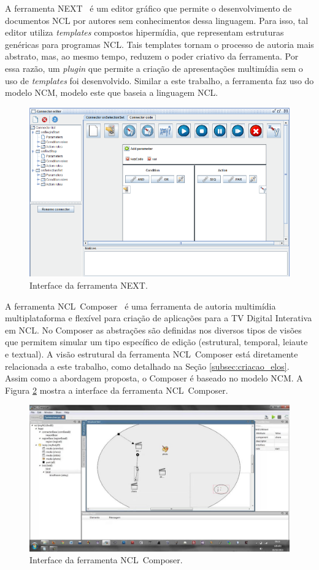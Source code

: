 \documentclass[../main.tex]{subfiles}
\begin{document}
A ferramenta NEXT~\cite{paulo_de_mattos_next_2013} é um editor gráfico que permite o desenvolvimento de documentos NCL por autores sem conhecimentos dessa linguagem. Para isso, tal editor utiliza \emph{templates} compostos hipermídia, que representam estruturas genéricas para programas NCL. Tais templates tornam o processo de autoria mais abstrato, mas, ao mesmo tempo, reduzem o poder criativo da ferramenta. Por essa razão, um \emph{plugin} que permite a criação de apresentações multimídia sem o uso de \emph{templates} foi desenvolvido. Similar a este trabalho, a ferramenta faz uso do modelo NCM, modelo este que baseia a linguagem NCL.

\begin{figure}[!h]
\centering
\includegraphics[width=0.5\linewidth]{IMG/Relacionados/next.png}
\caption{Interface da ferramenta NEXT.}
\label{fig:next}
\end{figure}

A ferramenta NCL~Composer~\cite{azevedo_composer_2014} é uma ferramenta de autoria multimídia multiplataforma e flexível para criação de aplicações para a TV Digital Interativa em NCL. No Composer as abstrações são definidas nos diversos tipos de visões que permitem simular um tipo específico de edição (estrutural, temporal, leiaute e textual). A visão estrutural da ferramenta NCL~Composer está diretamente relacionada a este trabalho, como detalhado na Seção \ref{subsec:criacao_elos}. Assim como a abordagem proposta, o Composer é baseado no modelo NCM. A Figura \ref{fig:composer} mostra a interface da ferramenta NCL~Composer.

\begin{figure}[!h]
\centering
\includegraphics[width=0.5\linewidth]{IMG/Relacionados/composer.jpg}
\caption{Interface da ferramenta NCL~Composer.}
\label{fig:composer}
\end{figure}
\end{document}

